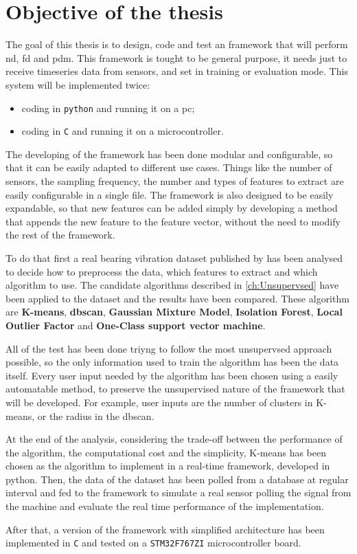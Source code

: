 \section{Objective of the thesis}
\label{sec:objectives}

The goal of this thesis is to design, code and test an framework that will perform \gls{nd}, \gls{fd} and \gls{pdm}. This framework is tought to be general purpose, it needs just to receive timeseries data from sensors, and set in training or evaluation mode.
This system will be implemented twice:
\begin{itemize}
    \item  coding in \texttt{python} and running it on a \gls{pc};
    \item   coding in \texttt{C} and running it on a microcontroller.
\end{itemize}

The developing of the framework has been done modular and configurable, so that it can be easily adapted to different use cases. Things like the number of sensors, the sampling frequency, the number and types of features to extract are easily configurable in a single file. The framework is also designed to be easily expandable, so that new features can be added simply by developing a method that appends the new feature to the feature vector, without the need to modify the rest of the framework.

To do that first a real bearing vibration dataset published by \cite{IMSpaper} has been analysed to decide how to preprocess the data, which features to extract and which algorithm to use. 
The candidate algorithms described in \autoref{ch:Unsupervsed} have been applied to the dataset and the results have been compared. These algorithm are \textbf{K-means}, \textbf{\gls{dbscan}}, \textbf{Gaussian Mixture Model}, \textbf{Isolation Forest}, \textbf{Local Outlier Factor} and \textbf{One-Class support vector machine}. 

All of the test has been done triyng to follow the most unsupervsed approach possible, so the only information used to train the algorithm has been the data itself. Every user input needed by the algorithm has been chosen using a easily automatable method, to preserve the unsupervised nature of the framework that will be developed. For example, user inputs are the number of clusters in K-means, or the radius in the \gls{dbscan}.

At the end of the analysis, considering the trade-off between the performance of the algorithm, the computational cost and the simplicity, K-means has been chosen as the algorithm to implement in a real-time framework, developed in python. Then, the data of the dataset has been polled from a database at regular interval and fed to the framework to simulate a real sensor polling the signal from the machine and evaluate the real time performance of the implementation.

After that, a version of the framework with simplified architecture has been implemented in \texttt{C} and tested on a \texttt{STM32F767ZI} microcontroller board.
